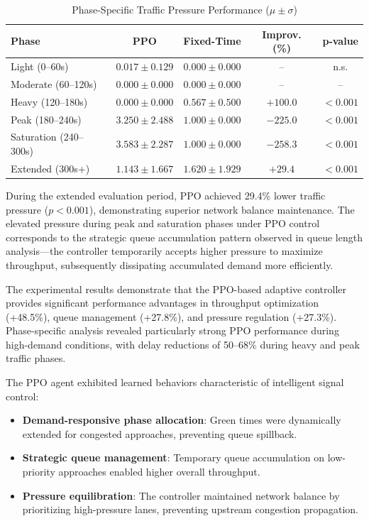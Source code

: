 \documentclass[11pt, a4paper]{report}
\begin{document}
\begin{table}[htbp]
\centering
\caption{Phase-Specific Traffic Pressure Performance ($\mu \pm \sigma$)}
\label{tab:pressure_phases}
\begin{tabular}{lcccc}
\toprule
\textbf{Phase} & \textbf{PPO} & \textbf{Fixed-Time} & \textbf{Improv. (\%)} & \textbf{p-value} \\
\midrule
Light (0--60s) & $0.017 \pm 0.129$ & $0.000 \pm 0.000$ & -- & n.s. \\
Moderate (60--120s) & $0.000 \pm 0.000$ & $0.000 \pm 0.000$ & -- & -- \\
Heavy (120--180s) & $0.000 \pm 0.000$ & $0.567 \pm 0.500$ & $+100.0$ & $<0.001$ \\
Peak (180--240s) & $3.250 \pm 2.488$ & $1.000 \pm 0.000$ & $-225.0$ & $<0.001$ \\
Saturation (240--300s) & $3.583 \pm 2.287$ & $1.000 \pm 0.000$ & $-258.3$ & $<0.001$ \\
Extended (300s+) & $1.143 \pm 1.667$ & $1.620 \pm 1.929$ & $+29.4$ & $<0.001$ \\
\bottomrule
\end{tabular}
\end{table}

During the extended evaluation period, PPO achieved 29.4\% lower traffic pressure ($p < 0.001$), demonstrating superior network balance maintenance. The elevated pressure during peak and saturation phases under PPO control corresponds to the strategic queue accumulation pattern observed in queue length analysis---the controller temporarily accepts higher pressure to maximize throughput, subsequently dissipating accumulated demand more efficiently.

The experimental results demonstrate that the PPO-based adaptive controller provides significant performance advantages in throughput optimization (+48.5\%), queue management (+27.8\%), and pressure regulation (+27.3\%). Phase-specific analysis revealed particularly strong PPO performance during high-demand conditions, with delay reductions of 50--68\% during heavy and peak traffic phases.

The PPO agent exhibited learned behaviors characteristic of intelligent signal control:

\begin{itemize}
    \item \textbf{Demand-responsive phase allocation}: Green times were dynamically extended for congested approaches, preventing queue spillback.
    \item \textbf{Strategic queue management}: Temporary queue accumulation on low-priority approaches enabled higher overall throughput.
    \item \textbf{Pressure equilibration}: The controller maintained network balance by prioritizing high-pressure lanes, preventing upstream congestion propagation.
\end{itemize}
\end{document}
